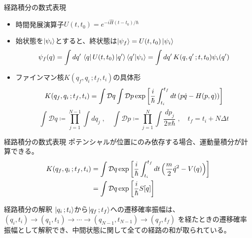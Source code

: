 \documentclass[14pt,aspectratio=169,xcolor=dvipsnames,table,dvipdfmx]{beamer}
\theoremstyle{definition}
\begin{document}
\begin{frame}{経路積分の数式表現}
  \begin{itemize}
    \item 時間発展演算子$U(t,t_0)=e^{-i\hat{H}(t-t_0)/\hbar}$
    \item 始状態を$\ket{\psi_i}$とすると、終状態は$\ket{\psi_f}=U(t,t_0)\ket{\psi_i}$
          \begin{equation*}
            \psi_f(q) = \int dq'\,\bra{q}U(t,t_0)\ket{q'}\bra{q'}\ket{\psi_i}
            = \int dq'\,K(q,q'\,;t,t_0)\psi_i(q')
          \end{equation*}
    \item ファインマン核$K(q_f,q_i\,;t_f,t_i)$の具体形
          \begin{equation*}
            K(q_f,q_i\,;t_f,t_i) = \int\mathcal{D}q\int\mathcal{D}p
            \exp\qty[\frac{i}{\hbar}\int_{t_i}^{t_f}dt\,(p\dot{q}-H(p,q))]
          \end{equation*}
          \begin{equation*}
            \int \mathcal{D}q \coloneqq \prod_{j=1}^{N-1} \int dq_j\;,\quad
            \int \mathcal{D}p \coloneqq \prod_{j=1}^N \int \frac{dp_j}{2\pi\hbar}\;,\quad
            t_f = t_i + N\varDelta t
          \end{equation*}
  \end{itemize}
\end{frame}
\begin{frame}{経路積分の数式表現}
  ポテンシャルが位置にのみ依存する場合、運動量積分が計算できる。
  \begin{align*}
    K(q_f,q_i\,;t_f,t_i) & = \int\mathcal{D}q
    \exp\qty[\frac{i}{\hbar}\int_{t_i}^{t_f}dt\,\qty(\frac{m}{2}\dot{q}^2 - V(q))] \\
                         & = \int\mathcal{D}q\exp\qty[\frac{i}{\hbar}S[q]]
  \end{align*}
  \begin{block}{経路積分の解釈}
    $\ket{q_i\,;t_i}$から$\ket{q_f\,;t_f}$への遷移確率振幅は、
    $(q_i,t_i)\to(q_1,t_1)\to\cdots\to(q_{N-1},t_{N-1})\to(q_f,t_f)$
    を経たときの遷移確率振幅として解釈でき、中間状態に関して全ての経路の和が取られている。
  \end{block}
\end{frame}
\end{document}
